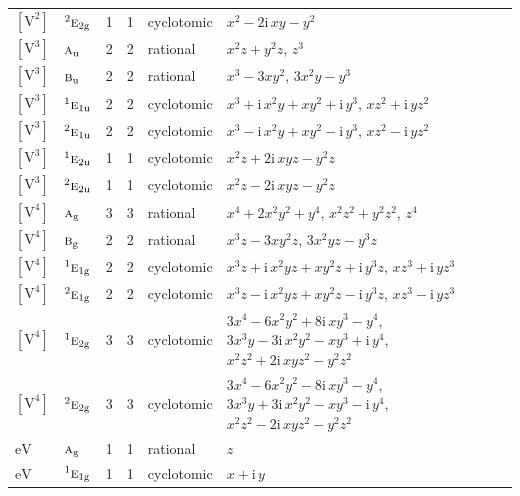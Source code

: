 \documentclass[10pt,a4paper]{article}
\numberwithin{equation}{section}
\newcommand{\irr}[1]{\text{\normalfont\scshape #1}}
\newcommand{\conjpair}[1]{{}^{#1}}
\newcommand{\ptag}[1]{\mathrm{#1}}
\newcommand{\iunit}{\mathrm{i}}
\newcommand{\jahn}[1]{\mathrm{#1}}
\newlength{\fillwidth}\newlength{\cellwidth}\newlength{\colwidth}
\begin{document}
{\begin{longtable}{@{}llrrl>{\RaggedRight\arraybackslash}p{\fillwidth}@{}}
$\jahn{[V^{2}]}$ & $\conjpair{2}\irr{e}_{2\ptag{g}}$ & 1 & 1 & cyclotomic & $x^{2} - 2\iunit{}\,xy - y^{2}$\\
$\jahn{[V^{3}]}$ & $\irr{a}_{\ptag{u}}$ & 2 & 2 & rational & $x^{2}z + y^{2}z$, $z^{3}$\\
$\jahn{[V^{3}]}$ & $\irr{b}_{\ptag{u}}$ & 2 & 2 & rational & $x^{3} - 3xy^{2}$, $3x^{2}y - y^{3}$\\
$\jahn{[V^{3}]}$ & $\conjpair{1}\irr{e}_{1\ptag{u}}$ & 2 & 2 & cyclotomic & $x^{3} + \iunit{}\,x^{2}y + xy^{2} + \iunit{}\,y^{3}$, $xz^{2} + \iunit{}\,yz^{2}$\\
$\jahn{[V^{3}]}$ & $\conjpair{2}\irr{e}_{1\ptag{u}}$ & 2 & 2 & cyclotomic & $x^{3} - \iunit{}\,x^{2}y + xy^{2} - \iunit{}\,y^{3}$, $xz^{2} - \iunit{}\,yz^{2}$\\
$\jahn{[V^{3}]}$ & $\conjpair{1}\irr{e}_{2\ptag{u}}$ & 1 & 1 & cyclotomic & $x^{2}z + 2\iunit{}\,xyz - y^{2}z$\\
$\jahn{[V^{3}]}$ & $\conjpair{2}\irr{e}_{2\ptag{u}}$ & 1 & 1 & cyclotomic & $x^{2}z - 2\iunit{}\,xyz - y^{2}z$\\
$\jahn{[V^{4}]}$ & $\irr{a}_{\ptag{g}}$ & 3 & 3 & rational & $x^{4} + 2x^{2}y^{2} + y^{4}$, $x^{2}z^{2} + y^{2}z^{2}$, $z^{4}$\\
$\jahn{[V^{4}]}$ & $\irr{b}_{\ptag{g}}$ & 2 & 2 & rational & $x^{3}z - 3xy^{2}z$, $3x^{2}yz - y^{3}z$\\
$\jahn{[V^{4}]}$ & $\conjpair{1}\irr{e}_{1\ptag{g}}$ & 2 & 2 & cyclotomic & $x^{3}z + \iunit{}\,x^{2}yz + xy^{2}z + \iunit{}\,y^{3}z$, $xz^{3} + \iunit{}\,yz^{3}$\\
$\jahn{[V^{4}]}$ & $\conjpair{2}\irr{e}_{1\ptag{g}}$ & 2 & 2 & cyclotomic & $x^{3}z - \iunit{}\,x^{2}yz + xy^{2}z - \iunit{}\,y^{3}z$, $xz^{3} - \iunit{}\,yz^{3}$\\
$\jahn{[V^{4}]}$ & $\conjpair{1}\irr{e}_{2\ptag{g}}$ & 3 & 3 & cyclotomic & $3x^{4} - 6x^{2}y^{2} + 8\iunit{}\,xy^{3} - y^{4}$, $3x^{3}y - 3\iunit{}\,x^{2}y^{2} - xy^{3} + \iunit{}\,y^{4}$, $x^{2}z^{2} + 2\iunit{}\,xyz^{2} - y^{2}z^{2}$\\
$\jahn{[V^{4}]}$ & $\conjpair{2}\irr{e}_{2\ptag{g}}$ & 3 & 3 & cyclotomic & $3x^{4} - 6x^{2}y^{2} - 8\iunit{}\,xy^{3} - y^{4}$, $3x^{3}y + 3\iunit{}\,x^{2}y^{2} - xy^{3} - \iunit{}\,y^{4}$, $x^{2}z^{2} - 2\iunit{}\,xyz^{2} - y^{2}z^{2}$\\
$\jahn{eV}$ & $\irr{a}_{\ptag{g}}$ & 1 & 1 & rational & $z$\\
$\jahn{eV}$ & $\conjpair{1}\irr{e}_{1\ptag{g}}$ & 1 & 1 & cyclotomic & $x + \iunit{}\,y$\\

\end{longtable}}
\end{document}
